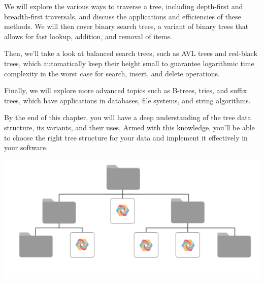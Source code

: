 We will explore the various ways to traverse a tree, including depth-first and breadth-first traversals, and discuss the applications and efficiencies of these methods. We will then cover binary search trees, a variant of binary trees that allows for fast lookup, addition, and removal of items.

Then, we'll take a look at balanced search trees, such as AVL trees and red-black trees, which automatically keep their height small to guarantee logarithmic time complexity in the worst case for search, insert, and delete operations.

Finally, we will explore more advanced topics such as B-trees, tries, and suffix trees, which have applications in databases, file systems, and string algorithms.

By the end of this chapter, you will have a deep understanding of the tree data structure, its variants, and their uses. Armed with this knowledge, you'll be able to choose the right tree structure for your data and implement it effectively in your software.

\includegraphics[width=1\textwidth]{fileStructure.png}


